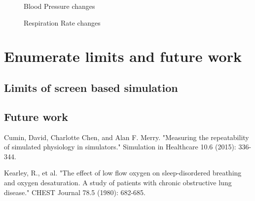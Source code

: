 \documentclass[a4paper]{article}
\begin{document}
\begin{figure}[!htb]\centering
   \begin{minipage}{0.49\textwidth}
     \caption{Blood Pressure changes}
     \label{fig:given 500 ug Fentanyl}
     
   \end{minipage}
   \begin {minipage}{0.49\textwidth}
     \caption{Respiration Rate changes}
     \label{fig:given 500 ug Fentanyl}
   \end{minipage}
\end{figure}


\section{Enumerate limits and future work}
\subsection{Limits of screen based simulation}
\subsection{Future work}

\begin{thebibliography}{1}

   Cumin, David, Charlotte Chen, and Alan F. Merry. "Measuring the repeatability of simulated physiology in simulators." Simulation in Healthcare 10.6 (2015): 336-344.

  Kearley, R., et al. "The effect of low flow oxygen on sleep-disordered breathing and oxygen desaturation. A study of patients with chronic obstructive lung disease." CHEST Journal 78.5 (1980): 682-685.  



  \end{thebibliography}
\end{document}
